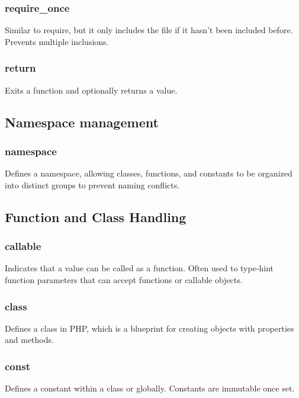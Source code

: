 \documentclass{report}
\begin{document}
    \subsubsection{require\_once}
    \bigbreak \noindent 
    Similar to require, but it only includes the file if it hasn’t been included before. Prevents multiple inclusions.

    \bigbreak \noindent 
    \subsubsection{return}
    \bigbreak \noindent 
    Exits a function and optionally returns a value.

    \pagebreak 
    \subsection{Namespace management}
    \bigbreak \noindent 
    \subsubsection{namespace}
    \bigbreak \noindent 
    Defines a namespace, allowing classes, functions, and constants to be organized into distinct groups to prevent naming conflicts.


    \pagebreak
\subsection{Function and Class Handling}
\bigbreak \noindent 
\subsubsection{callable}
\bigbreak \noindent 
Indicates that a value can be called as a function. Often used to type-hint function parameters that can accept functions or callable objects.

\bigbreak \noindent 
\subsubsection{class}
\bigbreak \noindent 
Defines a class in PHP, which is a blueprint for creating objects with properties and methods.

\bigbreak \noindent 
\subsubsection{const}
\bigbreak \noindent 
Defines a constant within a class or globally. Constants are immutable once set.
\end{document}
